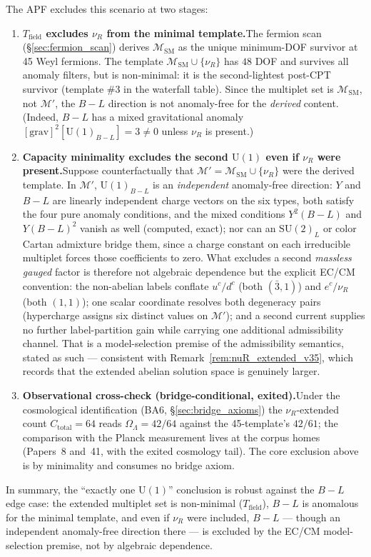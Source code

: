 \documentclass[11pt]{article}
\theoremstyle{definition}
\newcommand{\SU}{\mathrm{SU}}
\newcommand{\U}{\mathrm{U}}
\begin{document}
The APF excludes this scenario at two stages:
\begin{enumerate}[label=(\alph*),nosep]
  \item \textbf{$T_{\mathrm{field}}$ excludes $\nu_R$ from the minimal
  template.}\quad The fermion scan (\S\ref{sec:fermion_scan}) derives
  $\mathcal{M}_{\mathrm{SM}}$ as the unique minimum-DOF survivor at
  45 Weyl fermions.  The template
  $\mathcal{M}_{\mathrm{SM}} \cup \{\nu_R\}$ has $48$ DOF and survives
  all anomaly filters, but is non-minimal: it is the second-lightest
  post-CPT survivor (template \#3 in the waterfall table).  Since the
  multiplet set is $\mathcal{M}_{\mathrm{SM}}$, not $\mathcal{M}'$,
  the $B{-}L$ direction is not anomaly-free for the \emph{derived}
  content.  (Indeed, $B{-}L$ has a mixed gravitational anomaly
  $[\mathrm{grav}]^2[\U(1)_{B-L}] = 3 \ne 0$ unless $\nu_R$ is
  present.)
  \item \textbf{Capacity minimality excludes the second $\U(1)$ even
  if $\nu_R$ were present.}\quad Suppose counterfactually that
  $\mathcal{M}' = \mathcal{M}_{\mathrm{SM}} \cup \{\nu_R\}$ were the
  derived template.  In $\mathcal{M}'$, $\U(1)_{B-L}$ is an
  \emph{independent} anomaly-free direction: $Y$ and $B{-}L$ are
  linearly independent charge vectors on the six types, both satisfy
  the four pure anomaly conditions, and the mixed conditions
  $Y^2(B{-}L)$ and $Y(B{-}L)^2$ vanish as well (computed, exact); nor
  can an $\SU(2)_L$ or color Cartan admixture bridge them, since a
  charge constant on each irreducible multiplet forces those
  coefficients to zero.  What excludes a second \emph{massless
  gauged} factor is therefore not algebraic dependence but the
  explicit EC/CM convention: the non-abelian labels conflate
  $u^c / d^c$ (both $(\bar{3},1)$) and $e^c / \nu_R$ (both
  $(1,1)$); one scalar coordinate resolves both degeneracy pairs
  (hypercharge assigns six distinct values on $\mathcal{M}'$); and a
  second current supplies no further label-partition gain while
  carrying one additional admissibility channel.  That is a
  model-selection premise of the admissibility semantics, stated as
  such --- consistent with
  Remark~\ref{rem:nuR_extended_v35}, which records that the extended
  abelian solution space is genuinely larger.
  \item \textbf{Observational cross-check (bridge-conditional,
  exited).}\quad Under the cosmological identification (BA6,
  \S\ref{sec:bridge_axioms}) the $\nu_R$-extended count
  $C_{\mathrm{total}} = 64$ reads $\Omega_\Lambda = 42/64$ against
  the 45-template's $42/61$; the comparison with the Planck
  measurement lives at the corpus homes (Papers~8 and~41, with the
  exited cosmology tail).  The core exclusion above is by minimality
  and consumes no bridge axiom.
\end{enumerate}
In summary, the ``exactly one $\U(1)$'' conclusion is robust against
the $B{-}L$ edge case: the extended multiplet set is non-minimal
($T_{\mathrm{field}}$), $B{-}L$ is anomalous for the minimal template,
and even if $\nu_R$ were included, $B{-}L$ --- though an independent
anomaly-free direction there --- is excluded by the EC/CM
model-selection premise, not by algebraic dependence.
\end{document}
